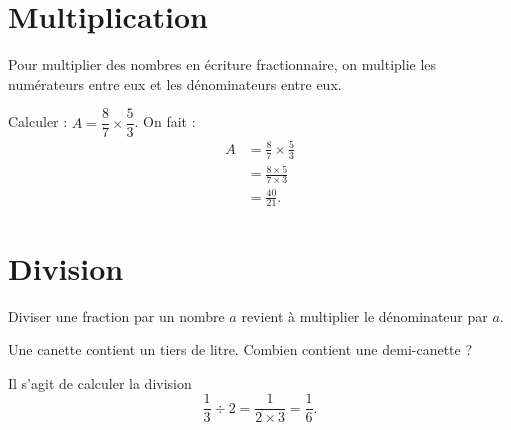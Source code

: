 \section{Multiplication}



\begin{Aretenir}
Pour multiplier des nombres en écriture fractionnaire, on multiplie les numérateurs entre eux et les dénominateurs entre eux.
\end{Aretenir}

\begin{example}
    Calculer : \( A=\dfrac{ 8 }{ 7 }\times \dfrac{ 5 }{ 3 }\). On fait :
    \begin{subequations}
        \begin{align}
            A&=\frac{ 8 }{ 7 }\times \frac{ 5 }{ 3 }\\
            &=\frac{ 8\times 5 }{ 7\times 3 }\\
            &=\frac{ 40 }{ 21 }.
        \end{align}
    \end{subequations}
\end{example}

\section{Division}



\begin{Aretenir}
   Diviser une fraction par un nombre \( a\) revient à multiplier le dénominateur par \( a\).
\end{Aretenir}


\begin{example}
    Une canette contient un tiers de litre. Combien contient une demi-canette ?

    Il s'agit de calculer la division
    \begin{equation}
        \dfrac{ 1 }{ 3 }\div 2=\frac{ 1 }{ 2\times 3 }=\frac{ 1 }{ 6 }.
    \end{equation}
\end{example}

